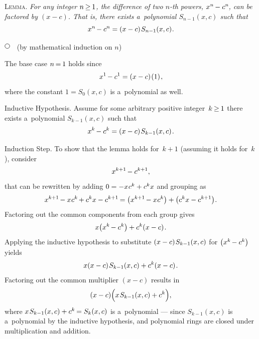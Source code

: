 \documentclass[11pt, twoside]{book}
\newcommand\fex{\hspace{.2ex}} %
\newcommand\nfex{\hspace{-0.2ex}} %
\newcommand\thex{\hspace{.1ex}} %
\newcommand{\textsb}[1]{{\fontseries{sb}\selectfont #1}}
\newcommand\ceq{\nfex=\nfex}
\newcommand\cge{\nfex\ge\nfex}
\newcommand\theproofbegins{\ensuremath{\tikz[baseline=-1ex] \draw [line width=.5pt, color=black, fill=white] (0, 0) circle (.8ex); \hspace{.6em}}}
\begin{document}
\newpage

\noindent
\textsc{Lemma}.
{\itshape
For any integer $n \cge 1$, the difference of two $n$-th powers, ${x^n \nfex - c^n\nfex}$,
can be factored by $(x - c)$.
That is, there exists a~polynomial ${S_{n-1}(x,c)}$
such that
}
\begin{equation*}
x^n \nfex - c^n = (x - c) \fex S_{n-1}(x,c)
\thex .
\end{equation*}

\noindent\theproofbegins
(by mathematical induction on $n$)

The \textsb{base case} ${n \ceq 1}$ holds since
%
\begin{equation*}
x^1 \nfex - c^1 = (x - c) \fex (1)
\fex ,
\end{equation*}
%
where the constant ${1 = S_0(x,c)}$ is a~polynomial as well.

\textsb{Inductive Hypothesis}.
Assume for some arbitrary positive integer~${k \cge 1}$
there exists a~polynomial $S_{k-1}(x,c)$ such that
%
\begin{equation*}
x^k \nfex - c^k = (x - c) \fex S_{k-1}(x,c)
\fex .
\end{equation*}

\textsb{Induction Step}.
To show that the lemma holds for~${k + 1}$ (assuming it holds for~$k$),
consider
%
\begin{equation*}
x^{k+1} \nfex - c^{k+1}
,
\end{equation*}
%
that can be rewritten by adding ${0 = - x \thex c^k + c^k x}$ and grouping as
%
\begin{equation*}
x^{k+1} \nfex - x \thex c^k \nfex + c^k x - c^{k+1} \nfex
= \bigl( x^{k+1} \nfex - x \thex c^k \bigr) + \bigl( c^k x - c^{k+1} \bigr)
\thex .
\end{equation*}
%
Factoring out the common components from each group gives
%
\begin{equation*}
x \bigl( x^k \nfex - c^k \bigr) + c^k(x - c)
\fex .
\end{equation*}
%
Applying the inductive hypothesis to substitute ${(x - c) \fex S_{k-1}(x,c)}$ for ${\bigl( x^k \nfex - c^k \bigr)}$ yields
%
\begin{equation*}
x (x - c) \fex S_{k-1}(x,c) + c^k(x - c)
\fex .
\end{equation*}
%
Factoring out the common multiplier $(x - c)$ results in
%
\begin{equation*}
(x - c) \Bigl( x \fex S_{k-1}(x,c) + c^k \Bigr)
,
\end{equation*}
%
where ${x \fex S_{k-1}(x,c) + c^k \nfex = S_k(x,c)}$ is a~polynomial
---
since ${S_{k-1}(x,c)}$ is a~polynomial by the inductive hypothesis,
and polynomial rings are closed under multiplication and addition.
\end{document}
